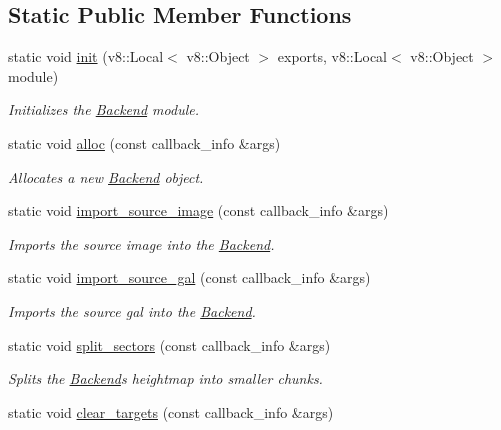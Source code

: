 \subsection*{Static Public Member Functions}
\begin{DoxyCompactItemize}
\item 
static void \hyperlink{class_backend_a3bbb39435c576093a6b74520ae463398}{init} (v8\+::\+Local$<$ v8\+::\+Object $>$ exports, v8\+::\+Local$<$ v8\+::\+Object $>$ module)
\begin{DoxyCompactList}\small\item\em Initializes the \hyperlink{class_backend}{Backend} module. \end{DoxyCompactList}\item 
static void \hyperlink{class_backend_af235a0e3a5689fb47afe9b392b93d979}{alloc} (const callback\+\_\+info \&args)
\begin{DoxyCompactList}\small\item\em Allocates a new \hyperlink{class_backend}{Backend} object. \end{DoxyCompactList}\item 
static void \hyperlink{class_backend_aef5331c3d0f698924124af87c2d5877c}{import\+\_\+source\+\_\+image} (const callback\+\_\+info \&args)
\begin{DoxyCompactList}\small\item\em Imports the source image into the \hyperlink{class_backend}{Backend}. \end{DoxyCompactList}\item 
static void \hyperlink{class_backend_a874fced9ef73eda11ce1489b5ec4838e}{import\+\_\+source\+\_\+gal} (const callback\+\_\+info \&args)
\begin{DoxyCompactList}\small\item\em Imports the source gal into the \hyperlink{class_backend}{Backend}. \end{DoxyCompactList}\item 
static void \hyperlink{class_backend_abe8afa9fcd0ae0564b27c306bd35948d}{split\+\_\+sectors} (const callback\+\_\+info \&args)
\begin{DoxyCompactList}\small\item\em Splits the \hyperlink{class_backend}{Backend}\textquotesingle{}s heightmap into smaller chunks. \end{DoxyCompactList}\item 
static void \hyperlink{class_backend_a30d9aa2b62ba8349b403ae6af2ec6b69}{clear\+\_\+targets} (const callback\+\_\+info \&args)

\end{DoxyCompactItemize}
